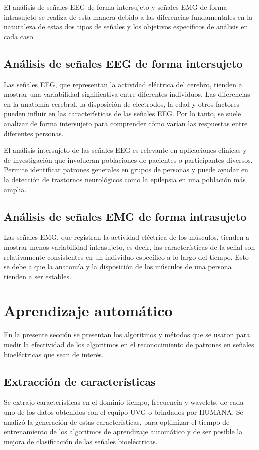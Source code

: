 El análisis de señales EEG de forma intersujeto y señales EMG de forma intrasujeto se realiza de esta manera debido a las diferencias fundamentales en la naturaleza de estas dos tipos de señales y los objetivos específicos de análisis en cada caso.

\subsection{Análisis de señales EEG de forma intersujeto}
Las señales EEG, que representan la actividad eléctrica del cerebro, tienden a mostrar una variabilidad significativa entre diferentes individuos. Las diferencias en la anatomía cerebral, la disposición de electrodos, la edad y otros factores pueden influir en las características de las señales EEG. Por lo tanto, se suele analizar de forma intersujeto para comprender cómo varían las respuestas entre diferentes personas.

El análisis intersujeto de las señales EEG es relevante en aplicaciones clínicas y de investigación que involucran poblaciones de pacientes o participantes diversos. Permite identificar patrones generales en grupos de personas y puede ayudar en la detección de trastornos neurológicos como la epilepsia en una población más amplia.

\subsection{Análisis de señales EMG de forma intrasujeto}
Las señales EMG, que registran la actividad eléctrica de los músculos, tienden a mostrar menos variabilidad intrasujeto, es decir, las características de la señal son relativamente consistentes en un individuo específico a lo largo del tiempo. Esto se debe a que la anatomía y la disposición de los músculos de una persona tienden a ser estables.


\section{Aprendizaje automático}
En la presente sección se presentan los algoritmos y métodos que se usaron para medir la efectividad de los algoritmos en el reconocimiento de patrones en señales bioeléctricas que sean de interés. 

\subsection{Extracción de características}
Se extrajo características en el dominio tiempo, frecuencia y wavelets, de cada uno de los datos obtenidos con el equipo UVG o brindados por HUMANA. Se analizó la generación de estas características, para optimizar el tiempo de entrenamiento de los algoritmos de aprendizaje automático y de ser posible la mejora de clasificación de las señales bioeléctricas.

